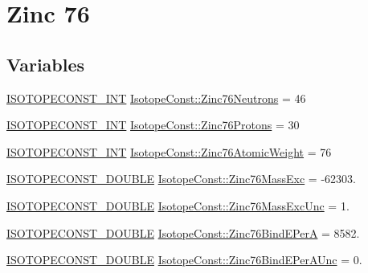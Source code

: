 \hypertarget{group___isotope_const-_zinc-_zn76}{}\section{Zinc 76}
\label{group___isotope_const-_zinc-_zn76}
\subsection*{Variables}
\begin{DoxyCompactItemize}
\item 
\mbox{\hyperlink{group___isotope_const-_macros_ga5f18360b3e99483a35c32d789e62621c}{I\+S\+O\+T\+O\+P\+E\+C\+O\+N\+S\+T\+\_\+\+I\+NT}} \mbox{\hyperlink{group___isotope_const-_zinc-_zn76_ga3167e660521b54b3513b7919d0b7d1e1}{Isotope\+Const\+::\+Zinc76\+Neutrons}} = 46
\item 
\mbox{\hyperlink{group___isotope_const-_macros_ga5f18360b3e99483a35c32d789e62621c}{I\+S\+O\+T\+O\+P\+E\+C\+O\+N\+S\+T\+\_\+\+I\+NT}} \mbox{\hyperlink{group___isotope_const-_zinc-_zn76_gac16d5adc32aa47bdcda57e951ba72201}{Isotope\+Const\+::\+Zinc76\+Protons}} = 30
\item 
\mbox{\hyperlink{group___isotope_const-_macros_ga5f18360b3e99483a35c32d789e62621c}{I\+S\+O\+T\+O\+P\+E\+C\+O\+N\+S\+T\+\_\+\+I\+NT}} \mbox{\hyperlink{group___isotope_const-_zinc-_zn76_gaf4ed81c874c729c7d3612cc1ab3ac013}{Isotope\+Const\+::\+Zinc76\+Atomic\+Weight}} = 76
\item 
\mbox{\hyperlink{group___isotope_const-_macros_ga8f45a7272ce02c0b4c65c44636ed719a}{I\+S\+O\+T\+O\+P\+E\+C\+O\+N\+S\+T\+\_\+\+D\+O\+U\+B\+LE}} \mbox{\hyperlink{group___isotope_const-_zinc-_zn76_ga8e64d4c629603e20c42ef66274d71db2}{Isotope\+Const\+::\+Zinc76\+Mass\+Exc}} = -\/62303.
\item 
\mbox{\hyperlink{group___isotope_const-_macros_ga8f45a7272ce02c0b4c65c44636ed719a}{I\+S\+O\+T\+O\+P\+E\+C\+O\+N\+S\+T\+\_\+\+D\+O\+U\+B\+LE}} \mbox{\hyperlink{group___isotope_const-_zinc-_zn76_gaeb730f2aa2600b6052f35978e50d35da}{Isotope\+Const\+::\+Zinc76\+Mass\+Exc\+Unc}} = 1.
\item 
\mbox{\hyperlink{group___isotope_const-_macros_ga8f45a7272ce02c0b4c65c44636ed719a}{I\+S\+O\+T\+O\+P\+E\+C\+O\+N\+S\+T\+\_\+\+D\+O\+U\+B\+LE}} \mbox{\hyperlink{group___isotope_const-_zinc-_zn76_ga1d97d50bbaa3162adad7ca6d50aaceeb}{Isotope\+Const\+::\+Zinc76\+Bind\+E\+PerA}} = 8582.
\item 
\mbox{\hyperlink{group___isotope_const-_macros_ga8f45a7272ce02c0b4c65c44636ed719a}{I\+S\+O\+T\+O\+P\+E\+C\+O\+N\+S\+T\+\_\+\+D\+O\+U\+B\+LE}} \mbox{\hyperlink{group___isotope_const-_zinc-_zn76_ga248441ba9d84a7867e3b038b83bb1dfe}{Isotope\+Const\+::\+Zinc76\+Bind\+E\+Per\+A\+Unc}} = 0.

\end{DoxyCompactItemize}
